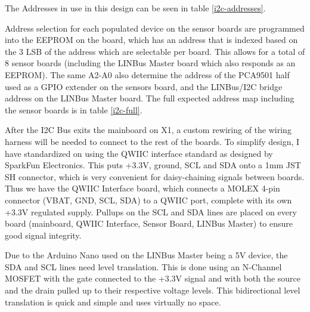 \documentclass[lettersize,journal]{IEEEtran}
\begin{document}
The Addresses in use in this design can be seen in table \ref{i2c-addresses}.

Address selection for each populated device on the sensor boards are programmed into the EEPROM on the board, which has an address that is indexed based on the 3 LSB of the address which are selectable per board.  This allows for a total of 8 sensor boards (including the LINBus Master board which also responds as an EEPROM).  The same A2-A0 also determine the address of the PCA9501 half used as a GPIO extender on the sensors board, and the LINBus/I2C bridge address on the LINBus Master board.  The full expected address map including the sensor boards is in table \ref{i2c-full}.

After the I2C Bus exits the mainboard on X1, a custom rewiring of the wiring harness will be needed to connect to the rest of the boards.  To simplify design, I have standardized on using the QWIIC interface standard as designed by SparkFun Electronics.  This puts +3.3V, ground, SCL and SDA onto a 1mm JST SH connector, which is very convenient for daisy-chaining signals between boards.  Thus we have the QWIIC Interface board, which connects a MOLEX 4-pin connector (VBAT, GND, SCL, SDA) to a QWIIC port, complete with its own +3.3V regulated supply.  Pullups on the SCL and SDA lines are placed on every board (mainboard, QWIIC Interface, Sensor Board, LINBus Master) to ensure good signal integrity.

Due to the Arduino Nano used on the LINBus Master being a 5V device, the SDA and SCL lines need level translation.  This is done using an N-Channel MOSFET with the gate connected to the +3.3V signal and with both the source and the drain pulled up to their respective voltage levels.  This bidirectional level translation is quick and simple and uses virtually no space.
\end{document}
